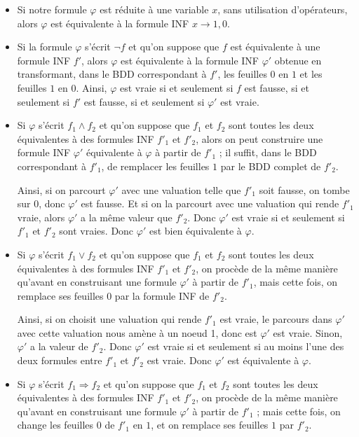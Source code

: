 \documentclass[a4paper,11pt]{article}
\begin{document}
		\begin{itemize}
		\item Si notre formule $\varphi$ est réduite à une variable $x$, sans utilisation d'opérateurs, alors $\varphi$ est équivalente à la formule INF $x \rightarrow 1,0$.
		\item Si la formule $\varphi$ s'écrit $\neg f$ et qu'on suppose que $f$ est équivalente à une formule INF $f'$, alors $\varphi$ est équivalente à la formule INF $\varphi'$ obtenue en transformant, dans le BDD correspondant à $f'$, les feuilles $0$ en $1$ et les feuilles $1$ en $0$. Ainsi, $\varphi$ est vraie si et seulement si $f$ est fausse, si et seulement si $f'$ est fausse, si et seulement si $\varphi'$ est vraie. 
		\item Si $\varphi$ s'écrit $f_1 \wedge f_2$ et qu'on suppose que $f_1$ et $f_2$ sont toutes les deux équivalentes à des formules INF ${f'}_1$ et ${f'}_2$, alors on peut construire une formule INF $\varphi'$ équivalente à $\varphi$ à partir de ${f'}_1$ ; il suffit, dans le BDD correspondant à ${f'}_1$, de remplacer les feuilles $1$ par le BDD complet de ${f'}_2$.
		
		Ainsi, si on parcourt $\varphi'$ avec une valuation telle que ${f'}_1$ soit fausse, on tombe sur $0$, donc $\varphi'$ est fausse. Et si on la parcourt avec une valuation qui rende ${f'}_1$ vraie, alors $\varphi'$ a la même valeur que ${f'}_2$. Donc $\varphi'$ est vraie si et seulement si ${f'}_1$ et ${f'}_2$ sont vraies. Donc $\varphi'$ est bien équivalente à $\varphi$.
		\item Si $\varphi$ s'écrit $f_1 \vee f_2$ et qu'on suppose que $f_1$ et $f_2$ sont toutes les deux équivalentes à des formules INF ${f'}_1$ et ${f'}_2$, on procède de la même manière qu'avant en construisant une formule $\varphi'$ à partir de ${f'}_1$, mais cette fois, on remplace ses feuilles $0$ par la formule INF de ${f'}_2$.
		
		Ainsi, si on choisit une valuation qui rende ${f'}_1$ est vraie, le parcours dans $\varphi'$ avec cette valuation nous amène à un noeud 1, donc est $\varphi'$ est vraie. Sinon, $\varphi'$ a la valeur de ${f'}_2$. Donc $\varphi'$ est vraie si et seulement si au moins l'une des deux formules entre ${f'}_1$ et ${f'}_2$ est vraie.
		Donc $\varphi'$ est équivalente à $\varphi$.
		\item Si $\varphi$ s'écrit $f_1 \Rightarrow f_2$ et qu'on suppose que $f_1$ et $f_2$ sont toutes les deux équivalentes à des formules INF ${f'}_1$ et ${f'}_2$, on procède de la même manière qu'avant en construisant une formule $\varphi'$ à partir de ${f'}_1$ ; mais cette fois, on change les feuilles $0$ de ${f'}_1$ en $1$, et on remplace ses feuilles $1$ par ${f'}_2$.
		

\end{itemize}
\end{document}

